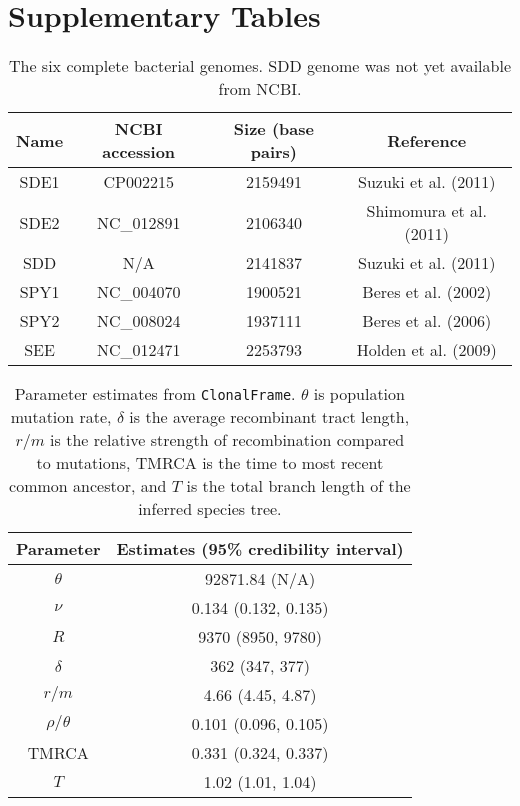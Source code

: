 \documentclass[english]{article}
\providecommand{\tabularnewline}{\\}
\begin{document}
\clearpage{}\setcounter{figure}{0}
\setcounter{table}{0}
\renewcommand{\figurename}{Supplementary Figure}
\renewcommand{\tablename}{Supplementary Table}

\section*{Supplementary Tables}
\clearpage{}

\begin{table}
\caption{\label{tab:genome}The six complete bacterial genomes. SDD genome was
not yet available from NCBI.}
\noindent \begin{centering}
\begin{tabular}{cccc}
\hline 
Name & NCBI accession & Size (base pairs) & Reference\tabularnewline
\hline
SDE1 & CP002215 & 2159491 & Suzuki et al. (2011)\tabularnewline
SDE2 & NC\_012891 & 2106340 & Shimomura et al. (2011)\tabularnewline
SDD & N/A & 2141837 & Suzuki et al. (2011)\tabularnewline
SPY1 & NC\_004070 & 1900521 & Beres et al. (2002)\tabularnewline
SPY2 & NC\_008024 & 1937111 & Beres et al. (2006)\tabularnewline
SEE & NC\_012471 & 2253793 & Holden et al. (2009)\tabularnewline
\hline
\end{tabular}
\par\end{centering}
\end{table}
\clearpage{}

\begin{table}
\caption{\label{tab:clonalframe}Parameter estimates from \texttt{ClonalFrame}. 
$\theta$ is population mutation rate,
$\delta$ is the average recombinant tract length,
$r/m$ is the relative strength of recombination compared to mutations,
TMRCA is the time to most recent common ancestor, and
$T$ is the total branch length of the inferred species tree.}
\noindent \centering{}\begin{tabular}{cc}
\hline
Parameter & Estimates (95\% credibility interval) \tabularnewline
\hline
$\theta$ & 92871.84 (N/A)\tabularnewline
$\nu$ & 0.134 (0.132, 0.135)\tabularnewline
$R$ & 9370 (8950, 9780)\tabularnewline
$\delta$ & 362 (347, 377)\tabularnewline
$r/m$ & 4.66 (4.45, 4.87)\tabularnewline
$\rho/\theta$ & 0.101 (0.096, 0.105)\tabularnewline
TMRCA & 0.331 (0.324, 0.337)\tabularnewline
$T$ & 1.02 (1.01, 1.04)\tabularnewline
\hline
\end{tabular}
\end{table}
\clearpage{}
\end{document}
